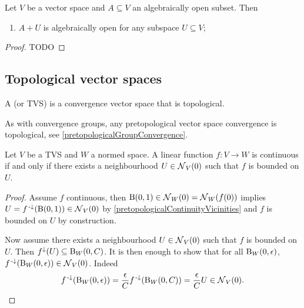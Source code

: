 \begin{proposition} \label{algebraicallyOpen}
Let $V$ be a vector space and $A \subseteq V$ an algebraically open subset. Then
\begin{enumerate}
\item $A+U$ is algebraically open for any subspace $U\subseteq V$;
\end{enumerate}
\end{proposition}
\begin{proof}
TODO
\end{proof}

\subsection{Topological vector spaces}
\begin{definition}
A  (or TVS) is a convergence vector space that is topological.
\end{definition}
As with convergence groups, any pretopological vector space convergence is topological, see \ref{pretopologicalGroupConvergence}.

\begin{lemma} \label{continuityToNormedSpace}
Let $V$ be a TVS and $W$ a normed space. A linear function $f: V\to W$ is continuous \textup{if and only if} there exists a neighbourhood $U\in \operatorname{\mathcal{N}}_V(0)$ such that $f$ is bounded on $U$.
\end{lemma}
\begin{proof}
Assume $f$ continuous, then $\operatorname{B}(0,1)\in \operatorname{\mathcal{N}}_W(0) = \operatorname{\mathcal{N}}_W(f(0))$ implies $U = f^{{\text{\hspace{0.15em}-}\downarrow}}(\operatorname{B}(0,1)) \in \operatorname{\mathcal{N}}_V(0)$ by \ref{pretopologicalContinuityVicinities} and $f$ is bounded on $U$ by construction.

Now assume there exists a neighbourhood $U\in \operatorname{\mathcal{N}}_V(0)$ such that $f$ is bounded on $U$. Then $f^{\downarrow}(U)\subseteq \operatorname{B}_W(0,C)$. It is then enough to show that for all $\operatorname{B}_W(0,\epsilon)$, $f^{{\text{\hspace{0.15em}-}\downarrow}}(\operatorname{B}_W(0,\epsilon)) \in \operatorname{\mathcal{N}}_V(0)$. Indeed
\[ f^{{\text{\hspace{0.15em}-}\downarrow}}(\operatorname{B}_W(0,\epsilon)) = \frac{\epsilon}{C} f^{{\text{\hspace{0.15em}-}\downarrow}}(\operatorname{B}_W(0,C)) = \frac{\epsilon}{C}U \in \operatorname{\mathcal{N}}_V(0). \]
\end{proof}

